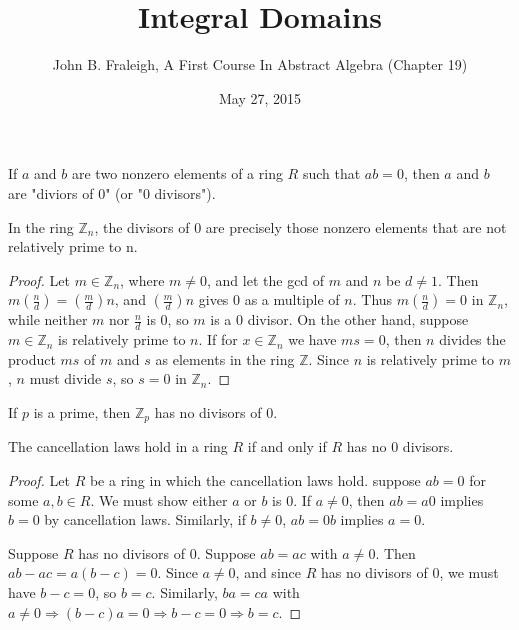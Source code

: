 \documentclass[a4paper,11pt]{article}
\title{Integral Domains}
\author{John B. Fraleigh, A First Course In Abstract Algebra (Chapter 19)}
\date{May 27, 2015}
\begin{document}
\maketitle
{}

\begin{outline}

    If \(a\) and \(b\) are two nonzero elements of a ring \(R\) such that \(ab = 0\), then \(a\) and 
    \(b\) are "diviors of \(0\)" (or "\(0\) divisors").

    In the ring \(\mathbb{Z}_n\), the divisors of \(0\) are precisely those nonzero elements that are 
    not relatively prime to n.
    
    \begin{proof}
      Let \(m \in \mathbb{Z}_n\), where \(m \neq 0\), and let the gcd of \(m\) and \(n\) be \(d \neq 1\). Then
      \(m(\frac{n}{d}) = (\frac{m}{d})n\), and \((\frac{m}{d})n\) gives \(0\) as a multiple of \(n\). Thus 
      \(m(\frac{n}{d}) = 0\) in \(\mathbb{Z}_n\), while neither \(m\) nor \(\frac{n}{d}\) is \(0\), so \(m\) 
      is a \(0\) divisor. On the other hand, suppose \(m \in \mathbb{Z}_n\) is relatively prime to \(n\). If 
      for \(x \in \mathbb{Z}_n\) we have \(ms = 0\), then \(n\) divides the product \(ms\) of \(m\) and \(s\) 
      as elements in the ring \(\mathbb{Z}\). Since \(n\) is relatively prime to \(m\), \(n\) must divide \(s\), 
      so \(s = 0\) in \(\mathbb{Z}_n\).
    \end{proof}
      
    If \(p\) is a prime, then \(\mathbb{Z}_p\) has no divisors of \(0\).
      
    The cancellation laws hold in a ring \(R\) if and only if \(R\) has no \(0\) divisors.
    
    \begin{proof}
      \forward
        Let \(R\) be a ring in which the cancellation laws hold. suppose \(ab = 0\) for some \(a, b \in R\).
        We must show either \(a\) or \(b\) is \(0\). If \(a \neq 0\), then \(ab = a0\) implies \(b = 0\) by cancellation laws.
        Similarly, if \(b \neq 0\), \(ab = 0b\) implies \(a = 0\).
        
      \backward
        Suppose \(R\) has no divisors of \(0\). Suppose \(ab = ac\) with \(a \neq 0\). Then  \(ab - ac = a(b-c) = 0\). 
        Since \(a \neq 0\), and since \(R\) has no divisors of \(0\), we must have \(b - c = 0\), so \(b = c\). 
        Similarly, \(ba = ca\) with \(a \neq 0 \Rightarrow (b - c)a = 0 \Rightarrow b - c = 0 \Rightarrow b = c\).
    \end{proof}


\end{outline}
\end{document}
